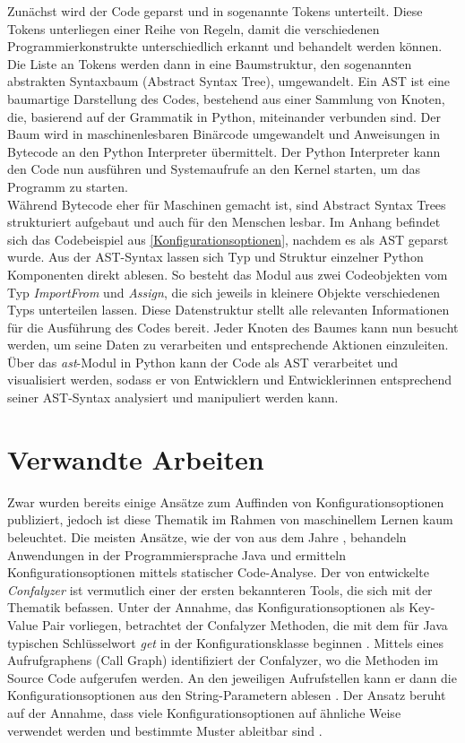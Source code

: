 \documentclass[german,bachelor]{swsLeipzig}
\begin{document}
Zunächst wird der Code geparst und in sogenannte Tokens unterteilt.
Diese Tokens unterliegen einer Reihe von Regeln, damit die verschiedenen Programmierkonstrukte unterschiedlich erkannt
und behandelt werden können.
Die Liste an Tokens werden dann in eine Baumstruktur, den sogenannten abstrakten Syntaxbaum (Abstract Syntax Tree), umgewandelt.
Ein AST ist eine baumartige Darstellung des Codes, bestehend aus einer Sammlung von Knoten, die, basierend auf der Grammatik
in Python, miteinander verbunden sind.
Der Baum wird in maschinenlesbaren Binärcode umgewandelt und Anweisungen in Bytecode an den Python Interpreter übermittelt.
Der Python Interpreter kann den Code nun ausführen und Systemaufrufe an den Kernel starten, um das Programm zu starten. \\

Während Bytecode eher für Maschinen gemacht ist, sind Abstract Syntax Trees strukturiert aufgebaut und auch für den Menschen lesbar.
Im Anhang befindet sich das Codebeispiel aus \ref{Konfigurationsoptionen}, nachdem es als AST geparst wurde.
Aus der AST-Syntax lassen sich Typ und Struktur einzelner Python Komponenten direkt ablesen.
So besteht das Modul aus zwei Codeobjekten vom Typ \textit{ImportFrom} und \textit{Assign}, die sich jeweils in kleinere
Objekte verschiedenen Typs unterteilen lassen.
Diese Datenstruktur stellt alle relevanten Informationen für die Ausführung des Codes bereit.
Jeder Knoten des Baumes kann nun besucht werden, um seine Daten zu verarbeiten und entsprechende Aktionen einzuleiten.
Über das \textit{ast}-Modul in Python kann der Code als AST verarbeitet und visualisiert werden, sodass er von
Entwicklern und Entwicklerinnen entsprechend seiner AST-Syntax analysiert und manipuliert werden kann.\\


\chapter{Verwandte Arbeiten}\label{Verwandte Arbeiten}
Zwar wurden bereits einige Ansätze zum Auffinden von Konfigurationsoptionen publiziert, jedoch ist diese Thematik im Rahmen von
maschinellem Lernen kaum beleuchtet.
Die meisten Ansätze, wie der von \citeauthor{10.1145/1985793.1985812} aus dem Jahre \citeyear{10.1145/1985793.1985812},
behandeln Anwendungen in der Programmiersprache Java und ermitteln Konfigurationsoptionen mittels statischer Code-Analyse.
Der von \citeauthor{10.1145/1985793.1985812} entwickelte \textit{Confalyzer} ist vermutlich einer der ersten bekannteren
Tools, die sich mit der Thematik befassen.
Unter der Annahme, das Konfigurationsoptionen als Key-Value Pair vorliegen, betrachtet der Confalyzer Methoden, die mit
dem für Java typischen Schlüsselwort \textit{get} in der Konfigurationsklasse beginnen \cite[]{10.1145/1985793.1985812}.
Mittels eines Aufrufgraphens (Call Graph) identifiziert der Confalyzer, wo die Methoden im Source Code aufgerufen werden.
An den jeweiligen Aufrufstellen kann er dann die Konfigurationsoptionen aus den String-Parametern ablesen \cite[]{10.1145/1985793.1985812}.
Der Ansatz beruht auf der Annahme, dass viele Konfigurationsoptionen auf ähnliche Weise verwendet werden und bestimmte
Muster ableitbar sind \cite[]{10.1145/1985793.1985812}.\\
\end{document}
